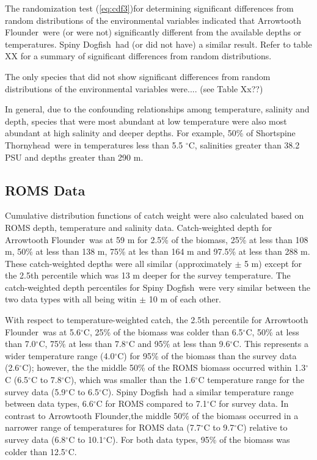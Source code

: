 \documentclass[11pt]{book}\usepackage[]{graphicx}\usepackage[]{color}
\newcommand{\fishnameARF}{Arrowtooth Flounder}
\newcommand{\fishnameDOG}{Spiny Dogfish}
\newcommand{\fishnameSST}{Shortspine Thornyhead}
\begin{document}
The randomization test (\ref{eq:cdf3})for determining significant differences from random distributions of the environmental variables indicated that \fishnameARF\ were (or were not) significantly different from the available depths or temperatures. \fishnameDOG\ had (or did not have) a similar result. Refer to table XX for a summary of significant differences from random distributions.

The only species that did not show significant differences from random distributions of the environmental variables were.... (see Table Xx??)

In general, due to the confounding relationships among temperature, salinity and depth, species that were most abundant at low temperature were also most abundant at high salinity and deeper depths. For example, 50\% of \fishnameSST\ were in temperatures less than 5.5 $^\circ$C, salinities greater than 38.2 PSU and depths greater than 290 m. 

\subsection{ROMS Data}
Cumulative distribution functions of catch weight were also calculated based on ROMS depth, temperature and salinity data. Catch-weighted depth for \fishnameARF\ was at 59 m for 2.5\% of the biomass, 25\% at less than 108 m, 50\% at less than 138 m, 75\% at les than 164 m and 97.5\% at less than 288 m. These catch-weighted depths were all similar (approximately $\pm$ 5 m) except for the 2.5th percentile which was 13 m deeper for the survey temperature. The catch-weighted depth percentiles for \fishnameDOG\ were very similar between the two data types with all being witin $\pm$ 10 m of each other. 

With respect to temperature-weighted catch, the 2.5th percentile for \fishnameARF\ was at 5.6$^\circ$C, 25\% of the biomass was colder than 6.5$^\circ$C, 50\% at less than 7.0$^\circ$C, 75\% at less than 7.8$^\circ$C and 95\% at less than 9.6$^\circ$C. This represents a wider temperature range (4.0$^\circ$C) for 95\% of the biomass than the survey data (2.6$^\circ$C); however, the the middle 50\% of the ROMS biomass occurred within 1.3$^\circ$C (6.5$^\circ$C to 7.8$^\circ$C), which was smaller than the 1.6$^\circ$C temperature range for the survey data (5.9$^\circ$C to 6.5$^\circ$C). \fishnameDOG\ had a similar temperature range between data types, 6.6$^\circ$C for ROMS compared to 7.1$^\circ$C for survey data. In contrast to \fishnameARF\@,the middle 50\% of the biomass occurred in a narrower range of temperatures for ROMS data (7.7$^\circ$C to 9.7$^\circ$C) relative to survey data (6.8$^\circ$C to 10.1$^\circ$C). For both data types, 95\% of the biomass was colder than 12.5$^\circ$C.  
\end{document}

